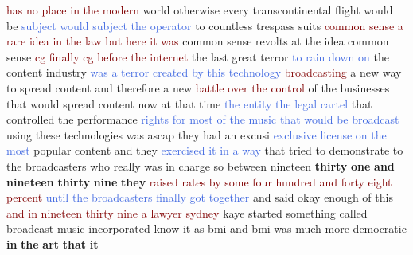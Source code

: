 \textcolor{Maroon}{has} \textcolor{Maroon}{no} \textcolor{Maroon}{place} \textcolor{Maroon}{in} \textcolor{Maroon}{the} \textcolor{Maroon}{modern} world otherwise every transcontinental flight would be \textcolor{RoyalBlue}{subject} \textcolor{RoyalBlue}{would} \textcolor{RoyalBlue}{subject} \textcolor{RoyalBlue}{the} \textcolor{RoyalBlue}{operator} to countless trespass suits \textcolor{Maroon}{common} \textcolor{Maroon}{sense} \textcolor{Maroon}{a} \textcolor{Maroon}{rare} \textcolor{Maroon}{idea} \textcolor{Maroon}{in} \textcolor{Maroon}{the} \textcolor{Maroon}{law} \textcolor{Maroon}{but} \textcolor{Maroon}{here} \textcolor{Maroon}{it} \textcolor{Maroon}{was} common sense revolts at the idea common sense \textcolor{Maroon}{{cg}} \textcolor{Maroon}{finally} \textcolor{Maroon}{{cg}} \textcolor{Maroon}{before} \textcolor{Maroon}{the} \textcolor{Maroon}{internet} the last great terror \textcolor{RoyalBlue}{to} \textcolor{RoyalBlue}{rain} \textcolor{RoyalBlue}{down} \textcolor{RoyalBlue}{on} the content industry \textcolor{RoyalBlue}{was} \textcolor{RoyalBlue}{a} \textcolor{RoyalBlue}{terror} \textcolor{RoyalBlue}{created} \textcolor{RoyalBlue}{by} \textcolor{RoyalBlue}{this} \textcolor{RoyalBlue}{technology} \textcolor{Maroon}{broadcasting} a new way to spread content and therefore a new \textcolor{Maroon}{battle} \textcolor{Maroon}{over} \textcolor{Maroon}{the} \textcolor{Maroon}{control} of the businesses that would spread content now at that time \textcolor{RoyalBlue}{the} \textcolor{RoyalBlue}{entity} \textcolor{RoyalBlue}{the} \textcolor{RoyalBlue}{legal} \textcolor{RoyalBlue}{cartel} that controlled the performance \textcolor{RoyalBlue}{rights} \textcolor{RoyalBlue}{for} \textcolor{RoyalBlue}{most} \textcolor{RoyalBlue}{of} \textcolor{RoyalBlue}{the} \textcolor{RoyalBlue}{music} \textcolor{RoyalBlue}{that} \textcolor{RoyalBlue}{would} \textcolor{RoyalBlue}{be} \textcolor{RoyalBlue}{broadcast} using these technologies was ascap they had an excusi \textcolor{RoyalBlue}{exclusive} \textcolor{RoyalBlue}{license} \textcolor{RoyalBlue}{on} \textcolor{RoyalBlue}{the} \textcolor{RoyalBlue}{most} popular content and they \textcolor{RoyalBlue}{exercised} \textcolor{RoyalBlue}{it} \textcolor{RoyalBlue}{in} \textcolor{RoyalBlue}{a} \textcolor{RoyalBlue}{way} that tried to demonstrate to the broadcasters who really was in charge so between nineteen \textbf{thirty} \textbf{one} \textbf{and} \textbf{nineteen} \textbf{thirty} \textbf{nine} \textbf{they} \textcolor{Maroon}{raised} \textcolor{Maroon}{rates} \textcolor{Maroon}{by} \textcolor{Maroon}{some} \textcolor{Maroon}{four} \textcolor{Maroon}{hundred} \textcolor{Maroon}{and} \textcolor{Maroon}{forty} \textcolor{Maroon}{eight} \textcolor{Maroon}{percent} \textcolor{RoyalBlue}{until} \textcolor{RoyalBlue}{the} \textcolor{RoyalBlue}{broadcasters} \textcolor{RoyalBlue}{finally} \textcolor{RoyalBlue}{got} \textcolor{RoyalBlue}{together} and said okay enough of this \textcolor{Maroon}{and} \textcolor{Maroon}{in} \textcolor{Maroon}{nineteen} \textcolor{Maroon}{thirty} \textcolor{Maroon}{nine} \textcolor{Maroon}{a} \textcolor{Maroon}{lawyer} \textcolor{Maroon}{sydney} kaye started something called broadcast music incorporated know it as bmi and bmi was much more democratic \textbf{in} \textbf{the} \textbf{art} \textbf{that} \textbf{it} 